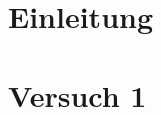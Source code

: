 \documentclass[12pt, oneside, a4paper, \docLanguage]{report}
\begin{document}

\setcounter{section}{0}



\clearpage

%
%


%
%


%
%


%
%




\setcounter{page}{1} 
\pagestyle{default}
%
%
\chapter{Einleitung}
\label{chap:EINL}

\cite{Franz2016n}
\cite{Franz2016e}

%
%
\chapter{Versuch 1}
\label{chap:VERSUCH_1}
\end{document}
